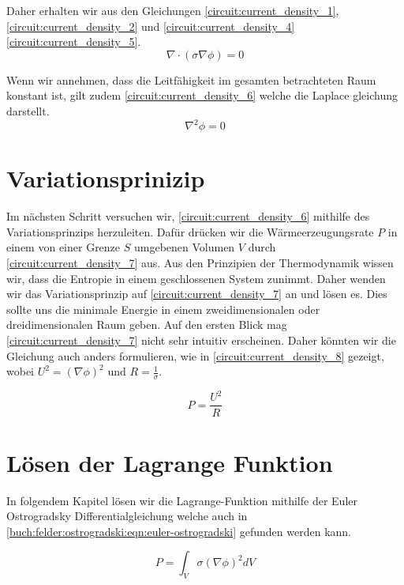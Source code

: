 Daher erhalten wir aus den Gleichungen \autoref{circuit:current_density_1}, \autoref{circuit:current_density_2} und \autoref{circuit:current_density_4} \autoref{circuit:current_density_5}.
\begin{equation}
\nabla \cdot (\sigma \nabla \phi)=0
\label{circuit:current_density_5}
\end{equation}

Wenn wir annehmen, dass die Leitfähigkeit im gesamten betrachteten Raum konstant ist, gilt zudem \autoref{circuit:current_density_6} welche die Laplace gleichung darstellt.
\begin{equation}
\nabla^2 \phi=0
\label{circuit:current_density_6}
\end{equation}

\section{Variationsprinizip}
Im nächsten Schritt versuchen wir, \autoref{circuit:current_density_6} mithilfe des Variationsprinzips herzuleiten. Dafür drücken wir die Wärmeerzeugungsrate $P$ in einem von einer Grenze $S$ umgebenen Volumen $V$ durch \autoref{circuit:current_density_7} aus. Aus den Prinzipien der Thermodynamik wissen wir, dass die Entropie in einem geschlossenen System zunimmt. Daher wenden wir das Variationsprinzip auf \autoref{circuit:current_density_7} an und lösen es. Dies sollte uns die minimale Energie in einem zweidimensionalen oder dreidimensionalen Raum geben. Auf den ersten Blick mag \autoref{circuit:current_density_7} nicht sehr intuitiv erscheinen. Daher könnten wir die Gleichung auch anders formulieren, wie in \autoref{circuit:current_density_8} gezeigt, wobei $U^2=\left( \nabla \phi \right)^2$ und $R=\frac{1}{\sigma}$.

\begin{equation}
	P=\frac{U^2}{R}
	\label{circuit:current_density_8}
\end{equation}

\section{Lösen der Lagrange Funktion}
In folgendem Kapitel lösen wir die Lagrange-Funktion mithilfe der Euler Ostrogradsky Differentialgleichung welche auch in \autoref{buch:felder:ostrogradski:eqn:euler-ostrogradski} gefunden werden kann.


\begin{equation}
P=\int_V \sigma(\nabla \phi)^2 d V
\label{circuit:current_density_7}
\end{equation}

